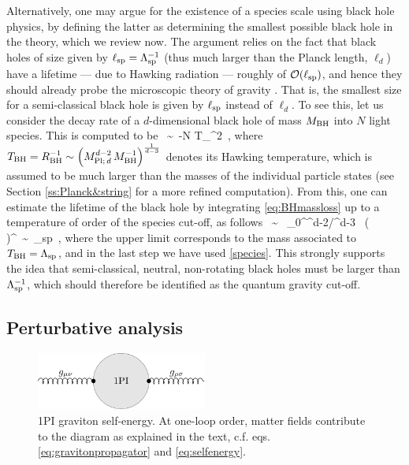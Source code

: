 Alternatively, one may argue for the existence of a species scale using black hole physics, by defining the latter as determining the smallest possible black hole in the theory, which we review now. The argument relies on the fact that black holes of size given by $\ell_{\rm sp}=\Lambda_{\text{sp}}^{-1}$ (thus much larger than the Planck length, $\ell_d$) have a lifetime --- due to Hawking radiation --- roughly of $\mathcal{O}(\ell_{\rm sp})$, and hence they should already probe the microscopic theory of gravity \cite{Dvali:2007hz, Dvali:2007wp}. That is, the smallest size for a semi-classical black hole is given by $\ell_{\rm sp}$ instead of $\ell_d$. To see this, let us consider the decay rate of a $d$-dimensional black hole of mass $M_{\text{BH}}$ into $N$ light species. This is computed to be \cite{Dvali:2007wp} 
%
\beq\label{eq:BHmassloss}
	\, \sim\, -N T_{}^2\, ,
\eeq
%
where $T_{\text{BH}}=R_{\text{BH}}^{-1} \sim \left( M_{\text{Pl;}\, d}^{d-2}\, M_{\text{BH}}^{-1}\right)^{\frac{1}{d-3}}$ denotes its Hawking temperature, which is assumed to be much larger than the masses of the individual particle states (see Section \ref{ss:Planck&string} for a more refined computation). From this, one can estimate the lifetime of the black hole by integrating \eqref{eq:BHmassloss} up to a temperature of order of the species cut-off, as follows
%
\beq
	\tau\ \sim\  \int_0^{\Mpd ^{d-2}/\LSP^{d-3}} \mu\ \left( \right)^{}\ \sim\  \ell_{\rm sp}\, ,
\eeq
%
where the upper limit corresponds to the mass associated to $T_{\text{BH}} = \Lambda_{\text{sp}}$, and in the last step we have used \eqref{species}. This strongly supports the idea that semi-classical, neutral, non-rotating black holes must be larger than $\Lambda_{\text{sp}}^{-1}$, which should therefore be identified as the quantum gravity cut-off. %

\subsection{Perturbative analysis}
\label{ss:perturbative}

\begin{figure}[htb]
\begin{center}
\includegraphics[width=0.5\textwidth]{1PI_graviton_2pt_function.pdf}
\caption{\small 1PI graviton self-energy. At one-loop order, matter fields contribute to the diagram as explained in the text, c.f. eqs. \eqref{eq:gravitonpropagator} and \eqref{eq:selfenergy}.}
\label{fig:1PIgraviton}
\end{center}
\end{figure}


